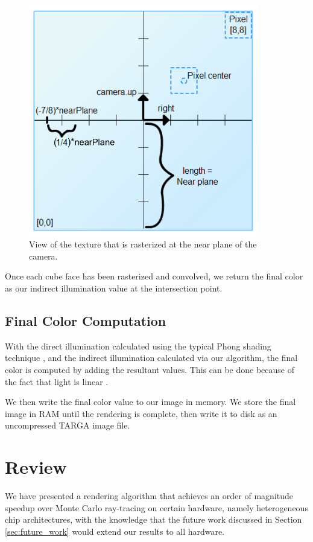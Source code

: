 \begin{figure}[h!]
   \centering
   \includegraphics[width=100mm]{../img/jPixelCenter.png}
   \captionfonts
   \caption[Cubemap texture]{View of the texture that is rasterized at the near plane of the camera.}
   \label{fig:cubemap_texture}
\end{figure}

Once each cube face has been rasterized and convolved, we return the final color as our indirect illumination value at the intersection point.

\subsection{Final Color Computation}

With the direct illumination calculated using the typical Phong shading technique \cite{bib:phong_thesis}, and the indirect illumination calculated via our algorithm, the final color is computed by adding the resultant values. This can be done because of the fact that light is linear \cite{bib:pbr}.

We then write the final color value to our image in memory. We store the final image in RAM until the rendering is complete, then write it to disk as an uncompressed TARGA image file.

\section{Review}
We have presented a rendering algorithm that achieves an order of magnitude speedup over Monte Carlo ray-tracing on certain hardware, namely heterogeneous chip architectures, with the knowledge that the future work discussed in Section \ref{sec:future_work} would extend our results to all hardware.


